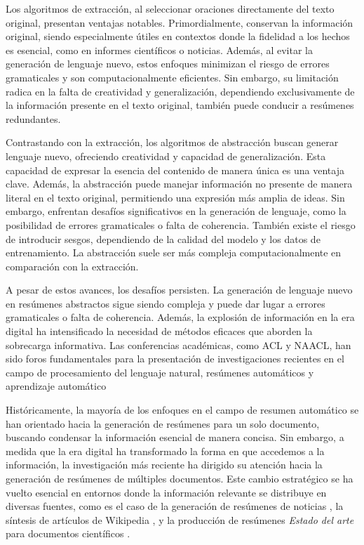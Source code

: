     Los algoritmos de extracción, al seleccionar oraciones directamente del texto original, presentan ventajas notables. Primordialmente, conservan la información original, siendo especialmente útiles en contextos donde la fidelidad a los hechos es esencial, como en informes científicos o noticias. Además, al evitar la generación de lenguaje nuevo, estos enfoques minimizan el riesgo de errores gramaticales y son computacionalmente eficientes. Sin embargo, su limitación radica en la falta de creatividad y generalización, dependiendo exclusivamente de la información presente en el texto original, también puede conducir a resúmenes redundantes.

    Contrastando con la extracción, los algoritmos de abstracción buscan generar lenguaje nuevo, ofreciendo creatividad y capacidad de generalización. Esta capacidad de expresar la esencia del contenido de manera única es una ventaja clave. Además, la abstracción puede manejar información no presente de manera literal en el texto original, permitiendo una expresión más amplia de ideas. Sin embargo, enfrentan desafíos significativos en la generación de lenguaje, como la posibilidad de errores gramaticales o falta de coherencia. También existe el riesgo de introducir sesgos, dependiendo de la calidad del modelo y los datos de entrenamiento. La abstracción suele ser más compleja computacionalmente en comparación con la extracción.

    A pesar de estos avances, los desafíos persisten. La generación de lenguaje nuevo en resúmenes abstractos sigue siendo compleja y puede dar lugar a errores gramaticales o falta de coherencia. Además, la explosión de información en la era digital ha intensificado la necesidad de métodos eficaces que aborden la sobrecarga informativa. Las conferencias académicas, como ACL y NAACL, han sido foros fundamentales para la presentación de investigaciones recientes en el campo de procesamiento del lenguaje natural, resúmenes automáticos y aprendizaje automático \cite{acl,naacl}

    Históricamente, la mayoría de los enfoques en el campo de resumen automático se han orientado hacia la generación de resúmenes para un solo documento, buscando condensar la información esencial de manera concisa. Sin embargo, a medida que la era digital ha transformado la forma en que accedemos a la información, la investigación más reciente ha dirigido su atención hacia la generación de resúmenes de múltiples documentos. Este cambio estratégico se ha vuelto esencial en entornos donde la información relevante se distribuye en diversas fuentes, como es el caso de la generación de resúmenes de noticias \cite{fabbri2019multi-news}, la síntesis de artículos de Wikipedia \cite{liu2018generating}, y la producción de resúmenes \emph{Estado del arte} para documentos científicos \cite{lu2020multixscience}.


